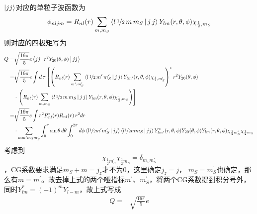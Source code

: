 \vspace{3mm}
\begin{exercise}
    $\ket{jj}$对应的单粒子波函数为
    \begin{equation*}
        \phi_{nljm} = R_{nl}(r) \sum_{m, m_{S}} \Braket{l\,\nicefrac{1}{2}\,m\,m_{S} | j\,j} Y_{lm}(r, \theta, \phi) \chi_{\frac{1}{2}, m_{S}}
    \end{equation*}
    则对应的四极矩写为
    \begin{equation*}
        \begin{aligned}
            Q =& \sqrt{\frac{16\pi}{5}} e \Braket{jj| r^2 Y_{20}(\theta, \phi) | jj} \\
            =&\sqrt{\frac{16\pi}{5}} e 
            \int d\,\tau \left[\left(R_{nl}(r) \sum_{m^{\prime}, m_{S}^{\prime}} \Braket{l\,\nicefrac{1}{2}\,m^{\prime}\,m_{S}^{\prime} | j\,j} Y_{lm^{\prime}}(r, \theta, \phi) \chi_{\frac{1}{2}, m_{S}^{\prime}}\right)^{\ast}
            r^2 Y_{20}(\theta, \phi) \right.\\
            & \cdot \left. \left(R_{nl}(r) \sum_{m, m_{S}} \Braket{l\,\nicefrac{1}{2}\,m\,m_{S} | j\,j} Y_{lm}(r, \theta, \phi) \chi_{\frac{1}{2}, m_{S}}\right) \right] \\
            =& \sqrt{\frac{16\pi}{5}} e
              \int r^2 R_{nl}^{\ast}(r) R_{nl}(r)\, r^2dr \\
             &\cdot
               \sum_{mm^{\prime}m_{S}m_{S}^{\prime}} \int_{0}^{\pi}\sin{\theta}\, d\theta \int_{0}^{2\pi} d\phi \Braket{l\nicefrac{1}{2}m^{\prime}m_{S}^{\prime} | jj}\Braket{l\nicefrac{1}{2}mm_{S} | jj}
               Y_{lm^{\prime}}^{\ast}(r, \theta, \phi) Y_{20}(\theta, \phi) Y_{lm}(r, \theta, \phi) \chi_{\frac{1}{2}m_{S}^{\prime}} \chi_{\frac{1}{2}m_{S}}\\
        \end{aligned}
    \end{equation*}
    考虑到
    \begin{equation*}
        \chi_{\frac{1}{2}m_{S}^{\prime}} \chi_{\frac{1}{2}m_{S}} = \delta_{m_{S}m_{S}^{\prime}}
    \end{equation*}
    ，CG系数要求满足$m_S + m = j_z$才不为0，这里确定$j_z = j$， $m_S = m_S^{\prime}$也确定，那么有$m = m^{\prime}$。故去掉上式的两个哑指标$m^{\prime}$、$m^{\prime}_{S}$，将两个CG系数提到积分号外，同时$Y^{\ast}_{lm} = (-1)^{m}Y_{l-m}$，故上式写成
    \begin{equation*}
        \begin{aligned}
        Q =& \sqrt{\frac{16\pi}{5}} e

\end{aligned}
\end{equation*}
\end{exercise}

